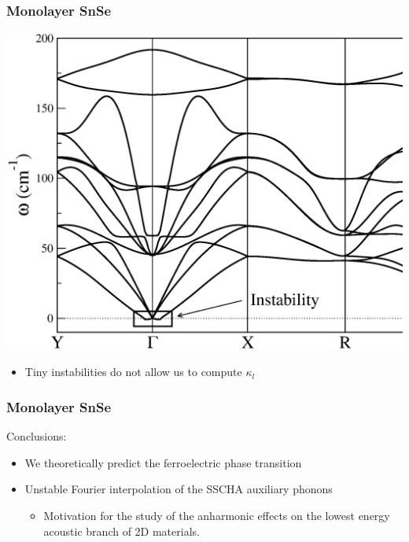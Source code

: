 \documentclass{beamer}
\begin{document}

\begin{frame}

\frametitle{Monolayer SnSe}
\vspace{0.5cm}
\begin{center}
 \includegraphics[width=0.8\linewidth]{Pictures/MonoSnSe/sscha-mono.eps}
\end{center}
\begin{itemize}
 \item Tiny instabilities do not allow us to compute $\kappa_{l}$
\end{itemize}

\end{frame}


\begin{frame}

\frametitle{Monolayer SnSe}
Conclusions:
\begin{itemize}
\item We theoretically predict the ferroelectric phase transition
\item Unstable Fourier interpolation of the SSCHA auxiliary phonons
\begin{itemize}
 \item Motivation for the study of the anharmonic effects on the lowest energy acoustic branch of 2D materials.
\end{itemize}
\end{itemize}

\end{frame}
\end{document}
